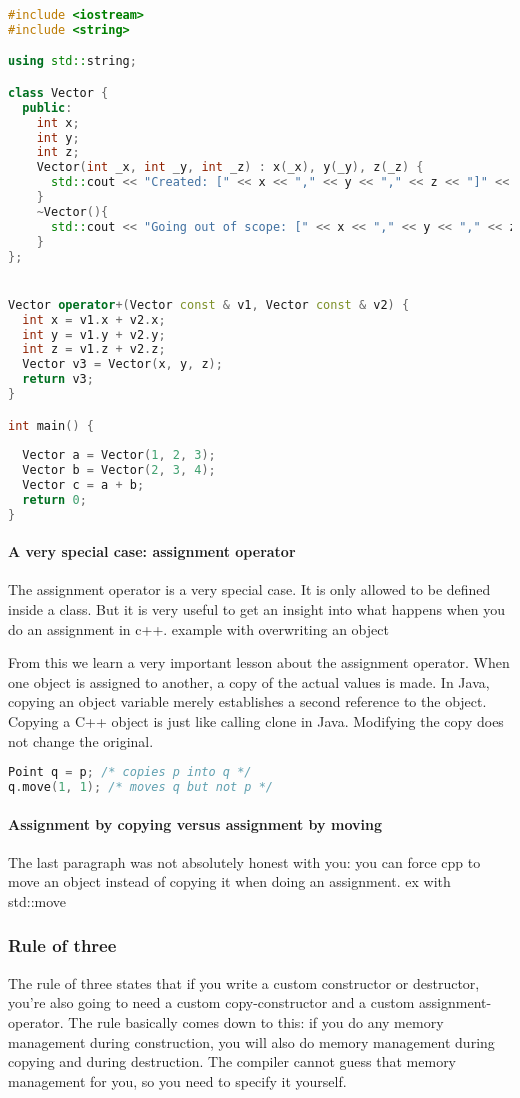 \begin{lstlisting}[language=c++]
#include <iostream>
#include <string>

using std::string;

class Vector {
  public:
    int x;
    int y;
    int z;
    Vector(int _x, int _y, int _z) : x(_x), y(_y), z(_z) {
      std::cout << "Created: [" << x << "," << y << "," << z << "]" << std::endl;
    }
    ~Vector(){
      std::cout << "Going out of scope: [" << x << "," << y << "," << z << "]" << std::endl;
    }
};


Vector operator+(Vector const & v1, Vector const & v2) {
  int x = v1.x + v2.x;
  int y = v1.y + v2.y;
  int z = v1.z + v2.z;
  Vector v3 = Vector(x, y, z);
  return v3;
}

int main() {
  
  Vector a = Vector(1, 2, 3);
  Vector b = Vector(2, 3, 4);
  Vector c = a + b;
  return 0;
}
\end{lstlisting}

\paragraph{A very special case: assignment operator} The assignment operator is a very special case. It is only allowed to be defined inside a class. But it is very useful to get an insight into what happens when you do an assignment in c++.
example with overwriting an object

From this we learn a very important lesson about the assignment operator. When one object is assigned to another, a copy of the actual values is made. In Java, copying an object variable merely establishes a second reference to the object. Copying a C++ object is just like calling clone in Java. Modifying the copy does not change the original.
\begin{lstlisting}[language=c++]
Point q = p; /* copies p into q */
q.move(1, 1); /* moves q but not p */
\end{lstlisting}


\paragraph{Assignment by copying versus assignment by moving} The last paragraph was not absolutely honest with you: you can force cpp to move an object instead of copying it when doing an assignment. 
ex with std::move



\subsubsection{Rule of three}
The rule of three states that if you write a custom constructor or destructor, you're also going to need a custom copy-constructor and a custom assignment-operator. The rule basically comes down to this: if you do any memory management during construction, you will also do memory management during copying and during destruction. The compiler cannot guess that memory management for you, so you need to specify it yourself. 

